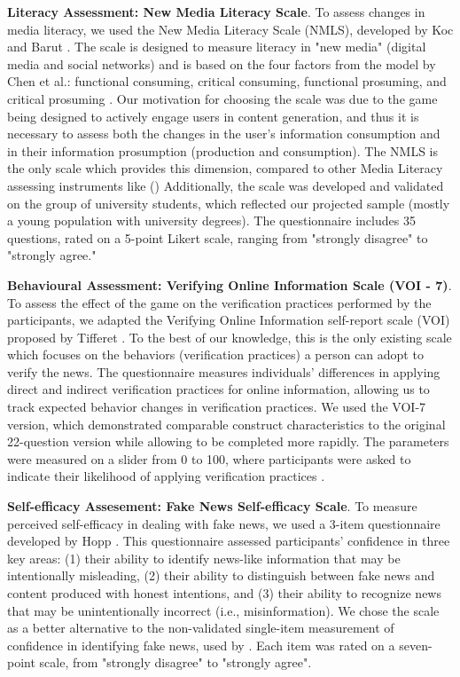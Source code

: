 \textbf{{Literacy Assessment:} New Media Literacy Scale}.
To assess changes in media literacy, we used the New Media Literacy Scale (NMLS), developed by Koc and Barut \cite{koc2016development}. The scale is designed to measure literacy in "new media" (digital media and social networks) and is based on the four factors from the model by Chen et al.: functional consuming, critical consuming, functional prosuming, and critical prosuming \cite{chenwu2011unpacking}. 
Our motivation for choosing the scale was due to the game being designed to actively engage users in content generation, and thus it is necessary to assess both the changes in the user’s information consumption and in their information prosumption (production and consumption). 
The NMLS is the only scale which provides this dimension, compared to other Media Literacy assessing instruments like (\cite{eristi2017development, vraga2015multi, ashley2013developing}) 
Additionally, the scale was developed and validated on the group of university students, which reflected our projected sample (mostly a young population with university degrees).
The questionnaire includes 35 questions, rated on a 5-point Likert scale, ranging from "strongly disagree" to "strongly agree."

\textbf{{Behavioural Assessment:} Verifying Online Information Scale (VOI - 7)}.
To assess the effect of the game on the verification practices performed by the participants, we adapted the Verifying Online Information self-report scale (VOI) proposed by Tifferet \cite{tifferet2021verifying}. 
To the best of our knowledge, this is the only existing scale which focuses on the behaviors (verification practices) a person can adopt to verify the news.
The questionnaire measures individuals' differences in applying direct and indirect verification practices for online information, allowing us to track expected behavior changes in verification practices. We used the VOI-7 version, which demonstrated comparable construct characteristics to the original 22-question version while allowing to be completed more rapidly. The parameters were measured on a slider from 0 to 100, where participants were asked to indicate their likelihood of applying verification practices \cite{tifferet2021verifying}.

\textbf{{Self-efficacy Assesement: }Fake News Self-efficacy Scale}. 
To measure perceived self-efficacy in dealing with fake news, we used a 3-item questionnaire developed by Hopp \cite{hopp2022fake}. This questionnaire assessed participants' confidence in three key areas: (1) their ability to identify news-like information that may be intentionally misleading, (2) their ability to distinguish between fake news and content produced with honest intentions, and (3) their ability to recognize news that may be unintentionally incorrect (i.e., misinformation). We chose the scale as a better alternative to the non-validated single-item measurement of confidence in identifying fake news, used by \cite{hinsley2021fake}.
Each item was rated on a seven-point scale, from "strongly disagree" to "strongly agree".

